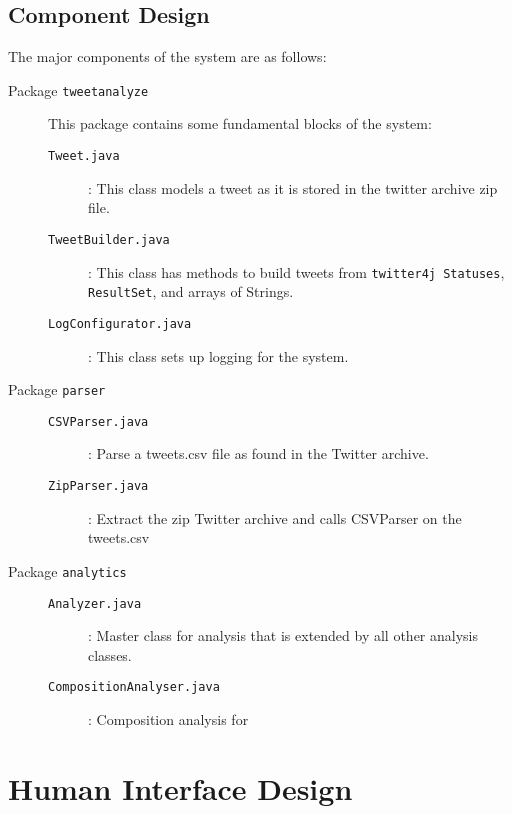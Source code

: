 \documentclass[a4paper, 12pt]{article}
\begin{document}
\subsection{Component Design} \label{sec:component}
\begin{adjustwidth}{1em}{0pt}
The major components of the system are as follows:
\begin{description}
	\item[Package \texttt{tweetanalyze}] This package contains some fundamental blocks of the system:
		\begin{description}
		\item[\texttt{Tweet.java}] : This class models a tweet as it is stored in the twitter archive zip file.
		\item[\texttt{TweetBuilder.java}] : This class has methods to build tweets from \texttt{twitter4j Statuses}, \texttt{ResultSet}, and arrays of Strings.
		\item[\texttt{LogConfigurator.java}] : This class sets up logging for the system.
		\end{description}
	\item[Package \texttt{parser}]
		\begin{description}
		\item[\texttt{CSVParser.java}] : Parse a tweets.csv file as found in the Twitter archive.
		\item[\texttt{ZipParser.java}] : Extract the zip Twitter archive and calls CSVParser on the tweets.csv
	\end{description}	
	\item[Package \texttt{analytics}]
		\begin{description}
		\item[\texttt{Analyzer.java}] : Master class for analysis that is extended by all other analysis classes.
		\item[\texttt{CompositionAnalyser.java}] : Composition analysis for 
	\end{description}	
\end{description}
\end{adjustwidth}

\section{Human Interface Design} \label{sec:human}
\end{document}
